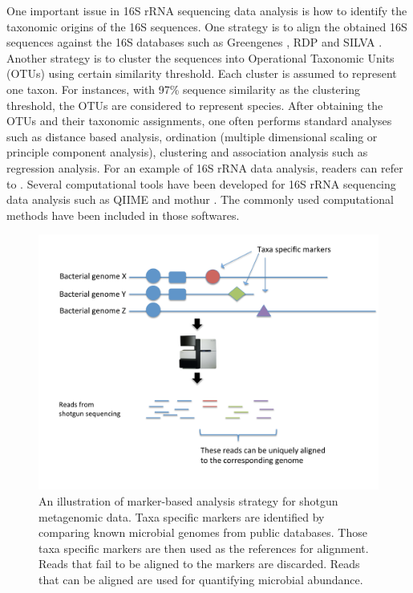 One important issue in 16S rRNA sequencing data analysis is how to identify the taxonomic origins of the 16S sequences. One strategy  is to align the obtained 16S sequences against the 16S databases such as Greengenes \citep{DeSantis:2006ii}, RDP \citep{Cole:2014jw} and SILVA \citep{Quast:2013hk}. Another strategy is to cluster the sequences into Operational Taxonomic Units (OTUs) using  certain similarity threshold. Each cluster is assumed to represent one taxon. For instances, with 97\% sequence similarity as the clustering threshold, the OTUs are considered to represent species.  After obtaining the OTUs and their taxonomic assignments, one often  performs  standard analyses such as distance based analysis, ordination (multiple dimensional scaling or principle component analysis), clustering and association analysis such as regression analysis. For an example of 16S rRNA data analysis, readers can refer to \citet{wu2011linking}. Several computational tools have been developed for 16S rRNA sequencing data analysis such as QIIME \citep{Caporaso:2010jf} and mothur \citep{Schloss:2009do}. The commonly used computational methods have been included in those softwares.



\begin{figure}[p]
	\begin{center}
		\includegraphics[scale=0.55,trim=0 0 0 0,clip]{Figure/F11_MetaPhlAn.pdf}
		\caption[An illustration of marker-based analysis strategy  for shotgun metagenomic data]{An illustration of marker-based analysis strategy  for shotgun metagenomic data. Taxa specific markers are identified by comparing known microbial genomes from public databases. Those taxa specific markers are then used as the references for alignment. Reads that fail to be aligned to the markers are discarded. Reads that can be aligned are used for quantifying microbial abundance.} \label{F11_MetaPhlAn}
	\end{center}
\end{figure}


